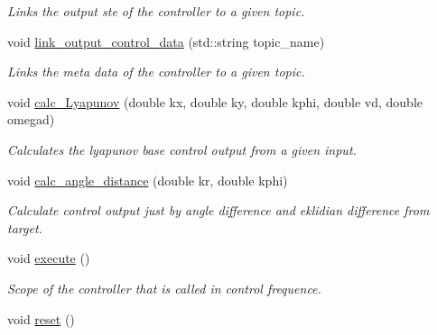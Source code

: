 \begin{DoxyCompactItemize}
\begin{DoxyCompactList}\small\item\em Links the output ste of the controller to a given topic. \end{DoxyCompactList}\item 
void \hyperlink{classController_abc1909639580e5359228c87fbd3a622b}{link\+\_\+output\+\_\+control\+\_\+data} (std\+::string topic\+\_\+name)
\begin{DoxyCompactList}\small\item\em Links the meta data of the controller to a given topic. \end{DoxyCompactList}\item 
void \hyperlink{classController_a56568ee07bb72983576e9d7c10eb3e83}{calc\+\_\+\+Lyapunov} (double kx, double ky, double kphi, double vd, double omegad)
\begin{DoxyCompactList}\small\item\em Calculates the lyapunov base control output from a given input. \end{DoxyCompactList}\item 
void \hyperlink{classController_a63249412728814430174c740d358a5c0}{calc\+\_\+angle\+\_\+distance} (double kr, double kphi)
\begin{DoxyCompactList}\small\item\em Calculate control output just by angle difference and eklidian difference from target. \end{DoxyCompactList}\item 
void \hyperlink{classController_a6661eb7307219216a7cb0a90e2a07e4d}{execute} ()\hypertarget{classController_a6661eb7307219216a7cb0a90e2a07e4d}{}\label{classController_a6661eb7307219216a7cb0a90e2a07e4d}

\begin{DoxyCompactList}\small\item\em Scope of the controller that is called in control frequence. \end{DoxyCompactList}\item 
void \hyperlink{classController_ab5515748f1b0c82f015e039c817ee5f7}{reset} ()\hypertarget{classController_ab5515748f1b0c82f015e039c817ee5f7}{}\label{classController_ab5515748f1b0c82f015e039c817ee5f7}


\end{DoxyCompactItemize}
